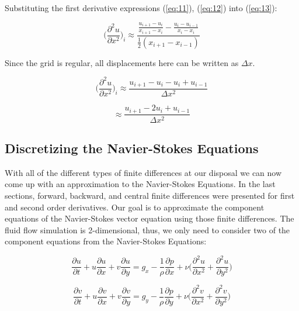 \documentclass[twocolumn,12pth]{article}
\begin{document}
Substituting the first derivative expressions (\ref{eq:11}), (\ref{eq:12}) into (\ref{eq:13}):

\begin{equation}
\bigg(\frac{\partial^2{u}}{\partial{x^2}}\bigg)_{i} \approx \frac{\frac{u_{i+1} - u_i}{x_{i+1} - x_i} - \frac{u_{i} - u_{i-1}}{x_{i} - x_{i}}}{\frac{1}{2}(x_{i+1} - x_{i-1})}
\end{equation}

Since the grid is regular, all displacements here can be written as $\Delta{x}$.

\begin{equation*}
\bigg(\frac{\partial^2{u}}{\partial{x^2}}\bigg)_{i} \approx \frac{u_{i+1} - u_i - u_i + u_{i-1}}{\Delta{x^2}}
\end{equation*}

\begin{equation*}
\approx \frac{u_{i+1} - 2u_i + u_{i-1}}{\Delta{x^2}}
\end{equation*}

\subsection{Discretizing the Navier-Stokes Equations}

With all of the different types of finite differences at our disposal we can now come up with an approximation to the Navier-Stokes Equations.
In the last sections, forward, backward, and central finite differences were presented for first and second order derivatives.
Our goal is to approximate the component equations of the Navier-Stokes vector equation using those finite differences.
The fluid flow simulation is 2-dimensional, thus, we only need to consider two of the component equations from the Navier-Stokes Equations:

\begin{equation}
\frac{\partial{u}}{\partial{t}} + u\frac{\partial{u}}{\partial{x}} + v\frac{\partial{u}}{\partial{y}} = g_x - \frac{1}{\rho}\frac{\partial{p}}{\partial{x}} + \nu \bigg( \frac{\partial^2u}{\partial{x}^2} + \frac{\partial^2u}{\partial{y}^2} \bigg)
\label{eq:exs1}
\end{equation}

\begin{equation*}
\frac{\partial{v}}{\partial{t}} + u\frac{\partial{v}}{\partial{x}} + v\frac{\partial{v}}{\partial{y}} = g_y -\frac{1}{\rho}\frac{\partial{p}}{\partial{y}} + \nu \bigg( \frac{\partial^2v}{\partial{x}^2} + \frac{\partial^2v}{\partial{y}^2} \bigg)
\end{equation*}
\end{document}
